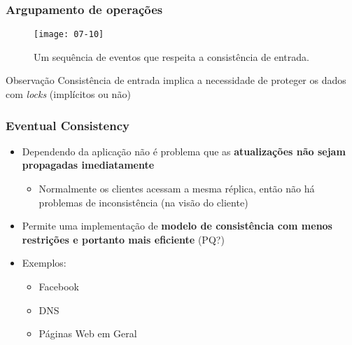 \documentclass[Ligatures=TeX,table,brazil,svgnames,usetotalslideindicator,compress,10pt]{beamer}
\begin{document}
\begin{frame}
  \frametitle{Argupamento de operações}

  \begin{figure}
    \centering
    \texttt{[image: 07-10]}
    \caption{Um sequência de eventos que respeita a consistência de entrada.}
  \end{figure}


  \begin{block}{Observação}
    Consistência de entrada implica a necessidade de proteger os dados
    com \textit{locks} (implícitos ou não)
  \end{block}

\end{frame}

\begin{frame}
  \frametitle{Eventual Consistency}
  \begin{itemize}
  \item Dependendo da aplicação não é problema que as \textbf{atualizações não
    sejam propagadas imediatamente}
    \begin{itemize}
    \item Normalmente os clientes acessam a mesma réplica, então não
      há problemas de inconsistência (na visão do cliente)
    \end{itemize}
  \item Permite uma implementação de \textbf{modelo de consistência com menos
    restrições e portanto mais eficiente} (PQ?)
  \item Exemplos:
    \begin{itemize}
    \item Facebook
    \item DNS
    \item Páginas Web em Geral
    \end{itemize}
  \end{itemize}

\end{frame}
\end{document}
